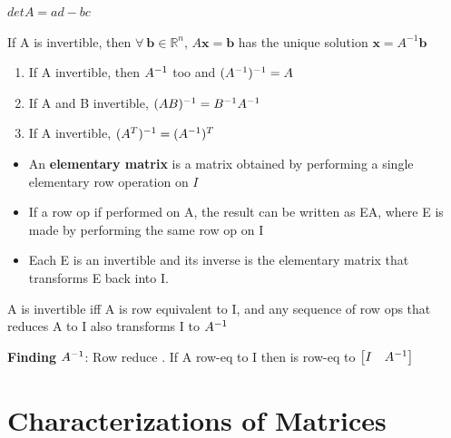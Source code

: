 \documentclass{report}
\begin{document}
$det A = ad - bc$

\begin{theorem}
    If A is invertible, then $\forall \ \mathbf{b} \in \mathbb{R}^n$,
    $A\mathbf{x} = \mathbf{b}$
    has the unique solution $\mathbf{x} = A^{-1}\mathbf{b}$
\end{theorem}
\vspace{1cm}
\begin{theorem}
\begin{enumerate}
    \item If A invertible, then $A^{-1}$ too and $(A^{-1})^{-1} = A$
    \item If A and B invertible, $(AB)^{-1} = B^{-1}A^{-1}$
    \item If A invertible, $(A^T)^{-1} = (A^{-1})^T$
\end{enumerate}
\end{theorem}

\begin{itemize}
    \item An \textbf{elementary matrix} is a matrix obtained by performing a single
elementary row operation on $I$
    \item If a row op if performed on A, the result can be written as EA, where E is made
    by performing the same row op on I
    \item Each E is an invertible and its inverse is the elementary matrix that transforms E back into I.
\end{itemize}

\begin{theorem}
    A is invertible iff A is row equivalent to I, and any sequence of row ops that reduces A
    to I also transforms I to $A^{-1}$
\end{theorem}

\textbf{Finding }$A^{-1}$: Row reduce \matAI. If A row-eq to I then \matAI is row-eq to
$\begin{bmatrix}I & A^{-1}\end{bmatrix}$

\setcounter{section}{2}
\section{Characterizations of Matrices}
\end{document}
